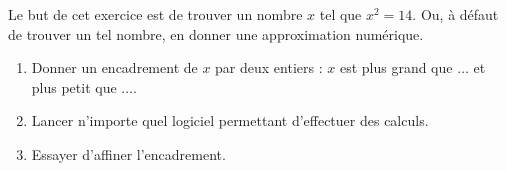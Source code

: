 
\begin{exercice}\label{exosmath-0901}

    Le but de cet exercice est de trouver un nombre \( x\) tel que \( x^2=14\). Ou, à défaut de trouver un tel nombre, en donner une approximation numérique.
    \begin{enumerate}
        \item
            Donner un encadrement de \( x\) par deux entiers : \( x\) est plus grand que \( \ldots\) et plus petit que \( \ldots\).
        \item
            Lancer n'importe quel logiciel permettant d'effectuer des calculs.
        \item
            Essayer d'affiner l'encadrement.
    \end{enumerate}

\end{exercice}
